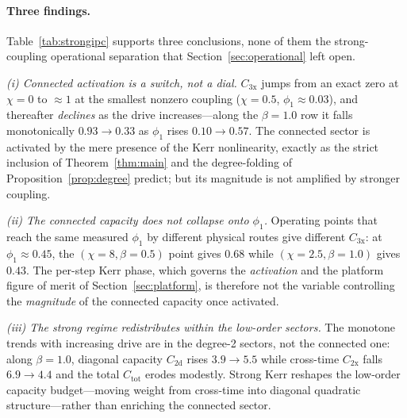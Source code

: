 \documentclass[11pt]{article}
\theoremstyle{remark}
\begin{document}
\paragraph{Three findings.} Table~\ref{tab:strongipc} supports three conclusions, none
of them the strong-coupling operational separation that Section~\ref{sec:operational}
left open.

\emph{(i) Connected activation is a switch, not a dial.} $C_{3\mathrm{x}}$ jumps from
an exact zero at $\chi=0$ to $\approx1$ at the smallest nonzero coupling
($\chi=0.5$, $\phi_1\approx0.03$), and thereafter \emph{declines} as the drive
increases---along the $\beta=1.0$ row it falls monotonically $0.93\to0.33$ as
$\phi_1$ rises $0.10\to0.57$. The connected sector is activated by the mere presence
of the Kerr nonlinearity, exactly as the strict inclusion of Theorem~\ref{thm:main}
and the degree-folding of Proposition~\ref{prop:degree} predict; but its magnitude is
not amplified by stronger coupling.

\emph{(ii) The connected capacity does not collapse onto $\phi_1$.} Operating points
that reach the same measured $\phi_1$ by different physical routes give different
$C_{3\mathrm{x}}$: at $\phi_1\approx0.45$, the $(\chi{=}8,\beta{=}0.5)$ point gives
$0.68$ while $(\chi{=}2.5,\beta{=}1.0)$ gives $0.43$. The per-step Kerr phase, which
governs the \emph{activation} and the platform figure of merit of
Section~\ref{sec:platform}, is therefore not the variable controlling the
\emph{magnitude} of the connected capacity once activated.

\emph{(iii) The strong regime redistributes within the low-order sectors.} The
monotone trends with increasing drive are in the degree-2 sectors, not the connected
one: along $\beta=1.0$, diagonal capacity $C_{2\mathrm{d}}$ rises $3.9\to5.5$ while
cross-time $C_{2\mathrm{x}}$ falls $6.9\to4.4$ and the total $C_{\mathrm{tot}}$ erodes
modestly. Strong Kerr reshapes the low-order capacity budget---moving weight from
cross-time into diagonal quadratic structure---rather than enriching the connected
sector.
\end{document}
